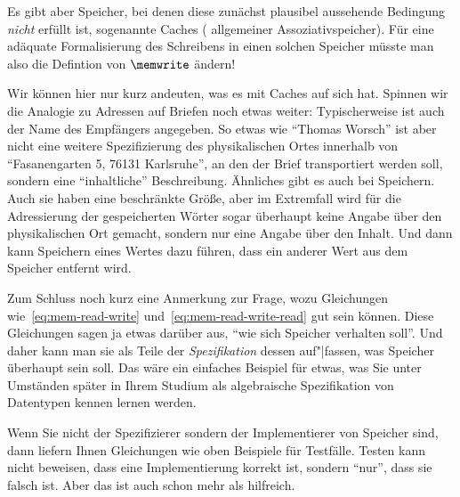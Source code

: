 Es gibt aber Speicher, bei denen diese zunächst plausibel aussehende
Bedingung \emph{nicht} erfüllt ist, \zB sogenannte Caches (\bzw
allgemeiner Assoziativspeicher). Für eine adäquate Formalisierung des
Schreibens in einen solchen Speicher müsste man also die Defintion von
$\memwrite$ ändern!

Wir können hier nur kurz andeuten, was es \zB mit Caches auf sich
hat. Spinnen wir die Analogie zu Adressen auf Briefen noch etwas
weiter: Typischerweise ist auch der Name des Empfängers angegeben. So
etwas wie "`Thomas Worsch"' ist aber nicht eine weitere Spezifizierung
des physikalischen Ortes innerhalb von "`Fasanengarten 5, 76131
Karlsruhe"', an den der Brief transportiert werden soll, sondern eine
"`inhaltliche"' Beschreibung. Ähnliches gibt es auch bei
Speichern. Auch sie haben eine beschränkte Größe, aber im Extremfall
wird für die Adressierung der gespeicherten Wörter sogar überhaupt
keine Angabe über den physikalischen Ort gemacht, sondern nur eine
Angabe über den Inhalt. Und dann kann Speichern eines Wertes dazu
führen, dass ein anderer Wert aus dem Speicher entfernt wird.

Zum Schluss noch kurz eine Anmerkung zur Frage, wozu Gleichungen
wie~\ref{eq:mem-read-write} und~\ref{eq:mem-read-write-read} gut sein
können.  Diese Gleichungen sagen ja etwas darüber aus, "`wie sich
Speicher verhalten soll"'. Und daher kann man sie als Teile der
\emph{Spezifikation} dessen auf"|fassen, was Speicher überhaupt sein
soll. Das wäre ein einfaches Beispiel für etwas, was Sie unter
Umständen später in Ihrem Studium als algebraische Spezifikation von
Datentypen kennen lernen werden.

Wenn Sie nicht der Spezifizierer sondern der Implementierer von
Speicher sind, dann liefern Ihnen Gleichungen wie oben Beispiele für
Testfälle. Testen kann nicht beweisen, dass eine Implementierung
korrekt ist, sondern "`nur"', dass sie falsch ist. Aber das ist auch
schon mehr als hilfreich.



